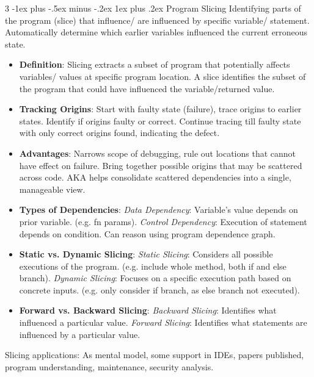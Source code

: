 \documentclass[a4paper, 10pt, landscape]{article}
\makeatletter
\renewcommand{\subsubsection}{\@startsection{subsubsection}{3}{0mm}%
                                {-1ex plus -.5ex minus -.2ex}%
                                {1ex plus .2ex}%
                                {\normalfont\small\bfseries}}
\makeatother
\begin{document}
\begin{multicols*}{3}
\subsubsection{Program Slicing}
Identifying parts of the program (slice) that influence/ are influenced by specific variable/ statement. Automatically determine which earlier variables influenced the current erroneous state.
\begin{itemize}[itemsep=-1pt]
\item \textbf{Definition}: Slicing extracts a subset of program that potentially affects variables/ values at specific program location. A slice identifies the subset of the program that could have influenced the variable/returned value.
\item \textbf{Tracking Origins}: Start with faulty state (failure), trace origins to earlier states. Identify if origins faulty or correct. Continue tracing till faulty state with only correct origins found, indicating the defect.
\item \textbf{Advantages}: Narrows scope of debugging, rule out locations that cannot have effect on failure. Bring together possible origins that may be scattered across code. AKA helps consolidate scattered dependencies into a single, manageable view.
\item \textbf{Types of Dependencies}: \textit{Data Dependency}: Variable's value depends on prior variable. (e.g. fn params). \textit{Control Dependency}: Execution of statement depends on condition. Can reason using program dependence graph.
\item \textbf{Static vs. Dynamic Slicing}: \textit{Static Slicing}: Considers all possible executions of the program. (e.g. include whole method, both if and else branch). \textit{Dynamic Slicing}: Focuses on a specific execution path based on concrete inputs. (e.g. only consider if branch, as else branch not executed).
\item \textbf{Forward vs. Backward Slicing}: \textit{Backward Slicing}: Identifies what influenced a particular value. \textit{Forward Slicing}: Identifies what statements are influenced by a particular value.
\end{itemize}
Slicing applications: As mental model, some support in IDEs, papers published, program understanding, maintenance, security analysis.


\end{multicols*}
\end{document}
